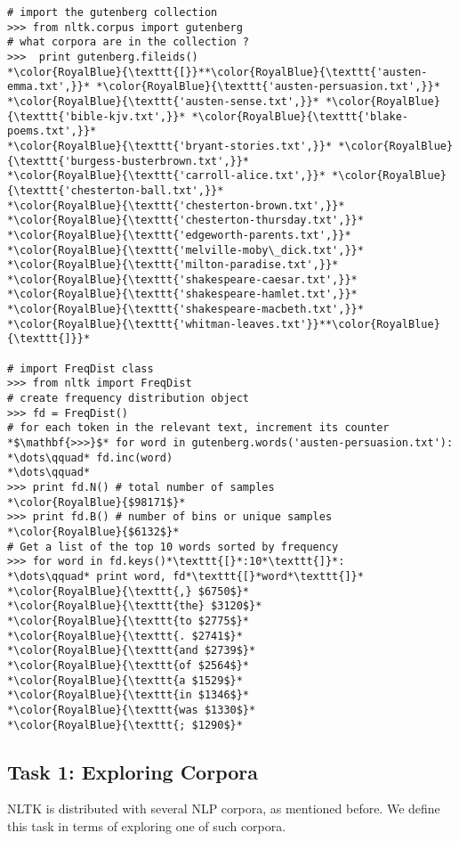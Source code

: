 \documentclass[11pt]{article}
\begin{document}
\begin{lstlisting}[float,caption=Exploring NLTK's bundled corpora.,label=task1,frame=trBL,escapechar=*]
# import the gutenberg collection
>>> from nltk.corpus import gutenberg
# what corpora are in the collection ?
>>>  print gutenberg.fileids()
*\color{RoyalBlue}{\texttt{[}}**\color{RoyalBlue}{\texttt{'austen-emma.txt',}}* *\color{RoyalBlue}{\texttt{'austen-persuasion.txt',}}*
*\color{RoyalBlue}{\texttt{'austen-sense.txt',}}* *\color{RoyalBlue}{\texttt{'bible-kjv.txt',}}* *\color{RoyalBlue}{\texttt{'blake-poems.txt',}}*
*\color{RoyalBlue}{\texttt{'bryant-stories.txt',}}* *\color{RoyalBlue}{\texttt{'burgess-busterbrown.txt',}}*
*\color{RoyalBlue}{\texttt{'carroll-alice.txt',}}* *\color{RoyalBlue}{\texttt{'chesterton-ball.txt',}}*
*\color{RoyalBlue}{\texttt{'chesterton-brown.txt',}}* *\color{RoyalBlue}{\texttt{'chesterton-thursday.txt',}}*
*\color{RoyalBlue}{\texttt{'edgeworth-parents.txt',}}* *\color{RoyalBlue}{\texttt{'melville-moby\_dick.txt',}}*
*\color{RoyalBlue}{\texttt{'milton-paradise.txt',}}* *\color{RoyalBlue}{\texttt{'shakespeare-caesar.txt',}}*
*\color{RoyalBlue}{\texttt{'shakespeare-hamlet.txt',}}* *\color{RoyalBlue}{\texttt{'shakespeare-macbeth.txt',}}*
*\color{RoyalBlue}{\texttt{'whitman-leaves.txt'}}**\color{RoyalBlue}{\texttt{]}}*

# import FreqDist class
>>> from nltk import FreqDist
# create frequency distribution object
>>> fd = FreqDist()
# for each token in the relevant text, increment its counter
*$\mathbf{>>>}$* for word in gutenberg.words('austen-persuasion.txt'):
*\dots\qquad* fd.inc(word)
*\dots\qquad*
>>> print fd.N() # total number of samples
*\color{RoyalBlue}{$98171$}*
>>> print fd.B() # number of bins or unique samples
*\color{RoyalBlue}{$6132$}*
# Get a list of the top 10 words sorted by frequency
>>> for word in fd.keys()*\texttt{[}*:10*\texttt{]}*:
*\dots\qquad* print word, fd*\texttt{[}*word*\texttt{]}*
*\color{RoyalBlue}{\texttt{,} $6750$}*
*\color{RoyalBlue}{\texttt{the} $3120$}*
*\color{RoyalBlue}{\texttt{to $2775$}*
*\color{RoyalBlue}{\texttt{. $2741$}*
*\color{RoyalBlue}{\texttt{and $2739$}*
*\color{RoyalBlue}{\texttt{of $2564$}*
*\color{RoyalBlue}{\texttt{a $1529$}*
*\color{RoyalBlue}{\texttt{in $1346$}*
*\color{RoyalBlue}{\texttt{was $1330$}*
*\color{RoyalBlue}{\texttt{; $1290$}*
\end{lstlisting}

\subsection{Task 1: Exploring Corpora}\label{sub:task_1} %
NLTK is distributed with several NLP corpora, as mentioned before. We define this task in terms of exploring one of such corpora.\\
\end{document}
